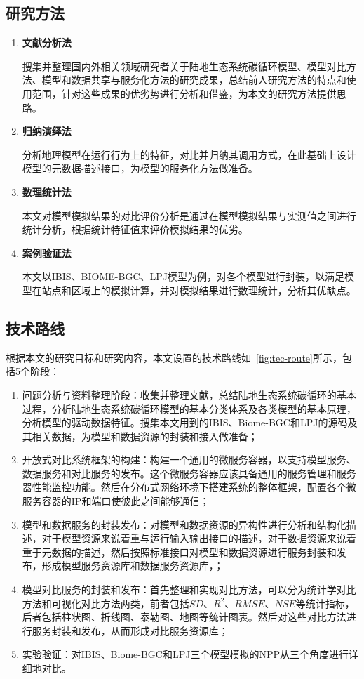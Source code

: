 \subsection{研究方法}
\begin{enumerate}[(1)]
\item \textbf{文献分析法}

搜集并整理国内外相关领域研究者关于陆地生态系统碳循环模型、模型对比方法、模型和数据共享与服务化方法的研究成果，总结前人研究方法的特点和使用范围，针对这些成果的优劣势进行分析和借鉴，为本文的研究方法提供思路。

\item \textbf{归纳演绎法}

分析地理模型在运行行为上的特征，对比并归纳其调用方式，在此基础上设计模型的元数据描述接口，为模型的服务化方法做准备。

\item \textbf{数理统计法}

本文对模型模拟结果的对比评价分析是通过在模型模拟结果与实测值之间进行统计分析，根据统计特征值来评价模拟结果的优劣。

\item \textbf{案例验证法}

本文以IBIS、BIOME-BGC、LPJ模型为例，对各个模型进行封装，以满足模型在站点和区域上的模拟计算，并对模拟结果进行数理统计，分析其优缺点。
\end{enumerate}


\subsection{技术路线}
根据本文的研究目标和研究内容，本文设置的技术路线如~\ref{fig:tec-route}所示，包括5个阶段：
\begin{enumerate}[(1)]
    \item 问题分析与资料整理阶段：收集并整理文献，总结陆地生态系统碳循环的基本过程，分析陆地生态系统碳循环模型的基本分类体系及各类模型的基本原理，分析模型的驱动数据特征。搜集本文用到的IBIS、Biome-BGC和LPJ的源码及其相关数据，为模型和数据资源的封装和接入做准备；
    \item 开放式对比系统框架的构建：构建一个通用的微服务容器，以支持模型服务、数据服务和对比服务的发布。这个微服务容器应该具备通用的服务管理和服务器性能监控功能。然后在分布式网络环境下搭建系统的整体框架，配置各个微服务容器的IP和端口使彼此之间能够通信；
    \item 模型和数据服务的封装发布：对模型和数据资源的异构性进行分析和结构化描述，对于模型资源来说着重与运行输入输出接口的描述，对于数据资源来说着重于元数据的描述，然后按照标准接口对模型和数据资源进行服务封装和发布，形成模型服务资源库和数据服务资源库，；
    \item 模型对比服务的封装和发布：首先整理和实现对比方法，可以分为统计学对比方法和可视化对比方法两类，前者包括$SD、R^2、RMSE、NSE$等统计指标，后者包括柱状图、折线图、泰勒图、地图等统计图表。然后对这些对比方法进行服务封装和发布，从而形成对比服务资源库；
    \item 实验验证：对IBIS、Biome-BGC和LPJ三个模型模拟的NPP从三个角度进行详细地对比。
\end{enumerate}

